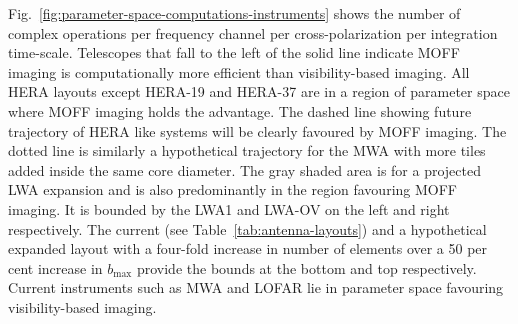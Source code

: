 \documentclass[a4paper,fleqn,usenatbib]{mnras}
\begin{document}
Fig.~\ref{fig:parameter-space-computations-instruments} shows the number of 
complex operations per frequency channel per cross-polarization per integration 
time-scale. Telescopes that fall to the left of the solid line indicate MOFF 
imaging is computationally more efficient than visibility-based imaging. All HERA 
layouts except HERA-19 and HERA-37 are in a region of parameter space 
where MOFF imaging holds the advantage. The dashed line showing future trajectory 
of HERA like systems will be clearly favoured by MOFF imaging. The dotted line is 
similarly a hypothetical trajectory for the MWA with more tiles added inside the 
same core diameter. The gray shaded area is for a projected LWA expansion and is 
also predominantly in the region favouring MOFF imaging. It is bounded by the LWA1 
and LWA-OV on the left and right respectively. The current (see 
Table~\ref{tab:antenna-layouts}) and a hypothetical expanded layout with a 
four-fold increase in number of elements over a 50 per cent increase in 
$b_\textrm{max}$ provide the bounds at the bottom and top respectively. Current 
instruments such as MWA and LOFAR lie in parameter space favouring 
visibility-based imaging. 
\end{document}
